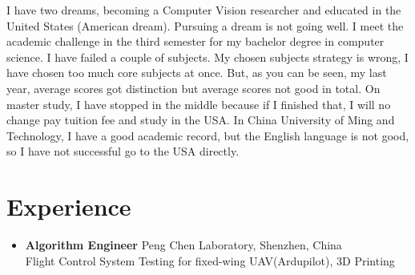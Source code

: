 \documentclass[]{friggeri-cv}
\renewenvironment{entrylist}{%
  \begin{itemize}[leftmargin=1in]%
  }{%
  \end{itemize}
}
\renewcommand{\entry}[4]{%
\item[#1]
  \textbf{#2}%
  \hfill%
  {\footnotesize\addfontfeature{Color=lightgray} #3}\\%
  #4\vspace{\parsep}%
}
\begin{document}
I have two dreams, becoming a Computer Vision researcher and educated in the
United States (American dream).  Pursuing a dream is not going well. I meet the
academic challenge in the third semester for my bachelor degree
in computer science. I have failed a couple of subjects. My chosen subjects
strategy is wrong, I have chosen too much core subjects at once. But, as you can
be seen, my last year, average scores got distinction but average scores not
good in total. On master study, I have stopped in the middle because if I
finished that, I will no change pay tuition fee and study in the USA. In China
University of Ming and Technology, I have a good academic record, but the
English language is not good, so I have not successful go to the USA directly.

\section{Experience}
\begin{entrylist}
  \entry
  {2018.12 - Now\\}
  {\large{Algorithm Engineer}}
  {Peng Chen Laboratory, Shenzhen, China}
  {Flight Control System Testing for fixed-wing UAV(Ardupilot), 3D Printing}

\end{entrylist}
\end{document}
